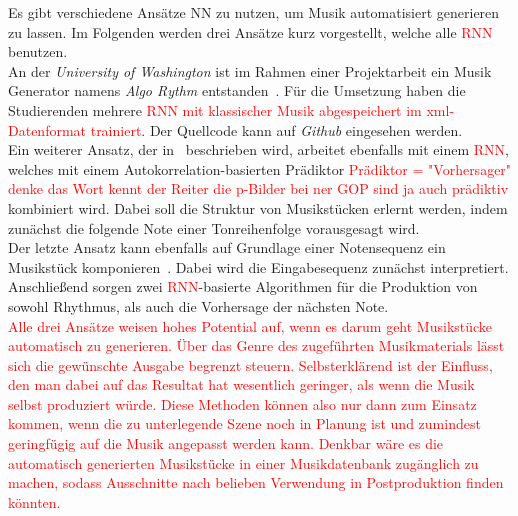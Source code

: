 \documentclass[times, 11pt,twocolumn]{article}
\begin{document}
 \label{sec:SOTAProduktion}
Es gibt verschiedene Ansätze NN zu nutzen, um Musik automatisiert generieren zu lassen. Im Folgenden werden drei Ansätze kurz vorgestellt, welche alle \textcolor{red}{RNN} benutzen. \\

An der \textit{University of Washington} ist im Rahmen einer Projektarbeit ein Musik Generator namens \textit{Algo Rythm} entstanden~\cite{Algorithm}. Für die Umsetzung haben die Studierenden mehrere \textcolor{red}{RNN} \textcolor{red}{mit klassischer Musik abgespeichert im xml-Datenformat trainiert}. Der Quellcode kann auf \textit{Github} \cite{AlgorithmGit} eingesehen werden.\\
Ein weiterer Ansatz, der in~\cite{eck+lapalme:2008} beschrieben wird, arbeitet ebenfalls mit einem \textcolor{red}{RNN}, welches mit einem Autokorrelation-basierten Prädiktor \textcolor{red}{Prädiktor = "Vorhersager" denke das Wort kennt der Reiter die p-Bilder bei ner GOP sind ja auch prädiktiv} kombiniert wird. Dabei soll die Struktur von Musikstücken erlernt werden, indem zunächst die folgende Note einer Tonreihenfolge vorausgesagt wird. \\

Der letzte Ansatz kann ebenfalls auf Grundlage einer Notensequenz ein Musikstück komponieren~\cite{browne2001system}. Dabei wird die Eingabesequenz zunächst interpretiert. Anschließend sorgen zwei \textcolor{red}{RNN}-basierte Algorithmen für die Produktion von sowohl Rhythmus, als auch die Vorhersage der nächsten Note. \\

\textcolor{red}{Alle drei Ansätze weisen hohes Potential auf, wenn es darum geht Musikstücke automatisch zu generieren. Über das Genre des zugeführten Musikmaterials lässt sich die gewünschte Ausgabe begrenzt steuern. Selbsterklärend ist der Einfluss, den man dabei auf das Resultat hat wesentlich geringer, als wenn die Musik selbst produziert würde. Diese Methoden können also nur dann zum Einsatz kommen, wenn die zu unterlegende Szene noch in Planung ist und zumindest geringfügig auf die Musik angepasst werden kann. Denkbar wäre es die automatisch generierten Musikstücke in einer Musikdatenbank zugänglich zu machen, sodass Ausschnitte nach belieben Verwendung in Postproduktion finden könnten.} 
\end{document}

